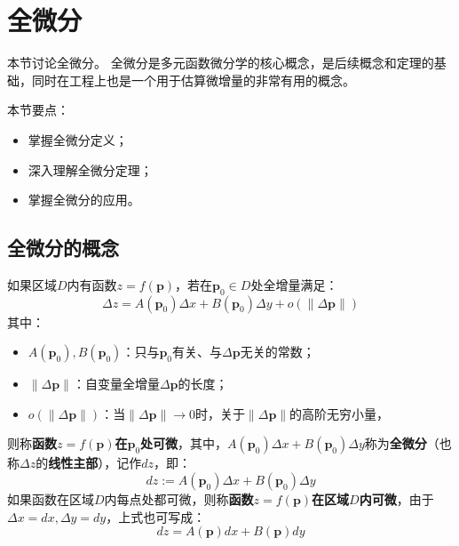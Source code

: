 \section{全微分}

本节讨论全微分。
全微分是多元函数微分学的核心概念，是后续概念和定理的基础，同时在工程上也是一个用于估算微增量的非常有用的概念。

本节要点：
\begin{itemize}
    \item 掌握全微分定义；
    \item 深入理解全微分定理；
    \item 掌握全微分的应用。
\end{itemize}

\subsection{全微分的概念}

\begin{definition}[全微分]
如果区域$D$内有函数$z=f\left( \boldsymbol{p} \right) $，若在$\boldsymbol{p}_0\in D$处全增量满足：
\[
\Delta z=A\left( \boldsymbol{p}_0 \right) \Delta x+B\left( \boldsymbol{p}_0 \right) \Delta y+o\left( \left\| \Delta \boldsymbol{p} \right\| \right)
\]
其中：
\begin{itemize}
    \item $A\left( \boldsymbol{p}_0 \right) ,B\left( \boldsymbol{p}_0 \right) $：只与$\boldsymbol{p}_0$有关、与$\Delta \boldsymbol{p}$无关的常数；
    \item $\left\| \Delta \boldsymbol{p} \right\| $：自变量全增量$\Delta \boldsymbol{p}$的长度；
    \item $o\left( \left\| \Delta \boldsymbol{p} \right\| \right) $：当$\left\| \Delta \boldsymbol{p} \right\| \rightarrow 0$时，关于$\left\| \Delta \boldsymbol{p} \right\| $的高阶无穷小量，
\end{itemize}
则称{\bf 函数$z=f\left( \boldsymbol{p} \right) $在$\boldsymbol{p}_0$处可微}，其中，$A\left( \boldsymbol{p}_0 \right) \Delta x+B\left( \boldsymbol{p}_0 \right) \Delta y$称为{\bf 全微分}（也称$\Delta z$的{\bf 线性主部}），记作$dz$，即：
\[
dz:=A\left( \boldsymbol{p}_0 \right) \Delta x+B\left( \boldsymbol{p}_0 \right) \Delta y
\]
如果函数在区域$D$内每点处都可微，则称{\bf 函数$z=f\left( \boldsymbol{p} \right) $在区域$D$内可微}，由于$\Delta x=dx,\Delta y=dy$，上式也可写成：
\[
dz=A\left( \boldsymbol{p} \right) dx+B\left( \boldsymbol{p} \right) dy
\]
\end{definition}

